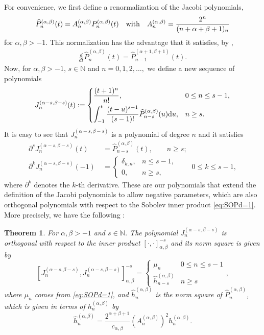 \documentclass{amsart}
\newtheorem{thm}{Theorem}[section]
\theoremstyle{remark}
\def\d{\mathrm{d}}
\def\a{{\alpha}}
\def\b{{\beta}}
\def\NN{{\mathbb N}}
\newcommand{\wh}{\widehat}
\begin{document}
For convenience, we first define a renormalization of the Jacobi polynomials,
\begin{equation} \label{eq:JacobiJ}
  \wh P^{(\alpha,\beta)}_{n}(t) = A_n^{(\a,\b)} {P}^{(\alpha,\beta)}_{n}(t) \quad\hbox{with}\quad
   A_n^{(\a,\b)} =  \frac{2^n}{(n+\a+\beta+1)_{n}}
\end{equation}
for $\a,\b> -1$. This normalization has the advantage that it satisfies, by \cite[(4.5.5)]{Sz},
\begin{align} \label{eq:diffJ}
  \frac{d}{dt} \wh P_n^{(\a,\b)}(t) =  \wh P_{n-1}^{(\a+1,\b+1)}(t).
\end{align}
Now, for $\a,\b > -1$, $s \in \NN$ and $n = 0,1,2,\ldots,$ we define a new sequence of polynomials
\begin{align} \label{eq:CJ}
\begin{split}
   J_n^{(\a-s,\b-s)}(t) := \begin{cases}  \dfrac{(t+1)^n}{n!}, & 0 \le n \le s-1, \vspace{.05in} \\
        \displaystyle{\int_{-1}^t \frac{(t-u)^{s-1}}{(s-1)!} \wh P_{n-s}^{(\a,\b)}(u) \d u}, & n \ge s.
   \end{cases}
\end{split}
\end{align}
It is easy to see that $J_n^{(\a-s,\b-s)}$ is a polynomial of degree $n$ and it satisfies
\begin{align}
 \partial^s J_n^{(\a-s,\b-s)}(t) &\ = \wh P_{n-s}^{(\a,\b)}(t), \qquad  n \ge s; \label{eq:CJ1a}\\
 \partial^k J_n^{(\a-s,\b-s)}(-1) &\ = \begin{cases} \delta_{k,n}, & n \le s-1, \\
         0, &  n \ge s,
         \end{cases} \qquad 0\le k \le s-1, \label{eq:CJ1b}
\end{align}
where $\partial^k$ denotes the $k$-th derivative. These are our polynomials that extend the definition of
the Jacobi polynomials to allow negative parameters, which are also orthogonal polynomials with respect to 
the Sobolev inner product \eqref{eq:SOPd=1}. More precisely, we have the following \cite{X19}:

\begin{thm}\label{thm:SOP-1d}
For $\a,\b > -1$ and $s \in \NN$. The polynomial $J_n^{(\a-s,\b-s)}$ is orthogonal with respect to the
inner product $\left[ \cdot, \cdot \right]_{\a,\b}^{-s}$ and its norm square is given by
$$
 \left[J_n^{(\a-s,\b-s)},J_n^{(\a-s,\b-s)}\right]_{\a,\b}^{-s}
   = \begin{cases}\mu_n &  0 \le n \le s-1 \\   \wh h_{n-s}^{(\a,\b)} & n \ge s \end{cases},
$$
where $\mu_n$ comes from \eqref{eq:SOPd=1}, and $\wh h_n^{(\a,\b)}$ is the norm square of $\wh P_n^{(\a,\b)}$, which is given in terms of $h_n^{(\a,\b)}$ by
$$
\wh h_n^{(\a,\b)} = \frac{2^{\a+\b+1}}{c_{\a,\b}} \left(A_n^{(\a,\b)}\right)^2 h_n^{(\a,\b)}.
$$
\end{thm}
\end{document}
